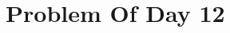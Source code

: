 \documentclass{article}
\newcommand{\YearPath}{../../../LatexConfig} %
\newcommand{\SemesterPath}{../../LatexConfig} %
\newcommand{\ClassPath}{../LatexConfig} %
\begin{document}




\section{Problem Of Day 12}

\end{document}
